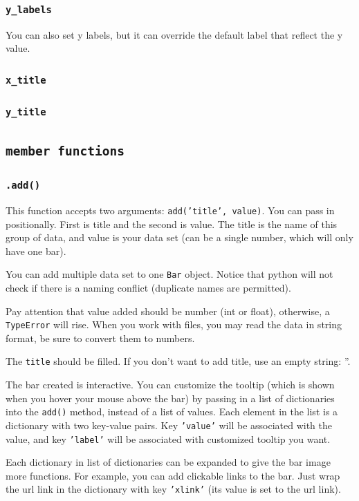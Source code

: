 \documentclass[12pt]{book}
\begin{document}
\subsubsection{\texttt{y\_labels}}
\label{sec:orgac2aa00}
You can also set y labels, but it can override the default label that reflect the y value.
\subsubsection{\texttt{x\_title}}
\label{sec:org8e05fe6}
\subsubsection{\texttt{y\_title}}
\label{sec:orgcd915a3}
\subsection{\texttt{member functions}}
\label{sec:org740082c}
\subsubsection{\texttt{.add()}}
\label{sec:orgac70331}
This function accepts two arguments: \texttt{add('title', value)}. You can pass in positionally. First is title and the second is value. The title is the name of this group of data, and value is your data set (can be a single number, which will only have one bar).

You can add multiple data set to one \texttt{Bar} object. Notice that python will not check if there is a naming conflict (duplicate names are permitted).

Pay attention that value added should be number (int or float), otherwise, a \texttt{TypeError} will rise. When you work with files, you may read the data in string format, be sure to convert them to numbers.

The \texttt{title} should be filled. If you don't want to add title, use an empty string: ''.

The bar created is interactive. You can customize the tooltip (which is shown when you hover your mouse above the bar) by passing in a list of dictionaries into the \texttt{add()} method, instead of a list of values. Each element in the list is a dictionary with two key-value pairs. Key \texttt{'value'} will be associated with the value, and key \texttt{'label'} will be associated with customized tooltip you want.

Each dictionary in list of dictionaries can be expanded to give the bar image more functions. For example, you can add clickable links to the bar. Just wrap the url link in the dictionary with key \texttt{'xlink'} (its value is set to the url link).
\end{document}
